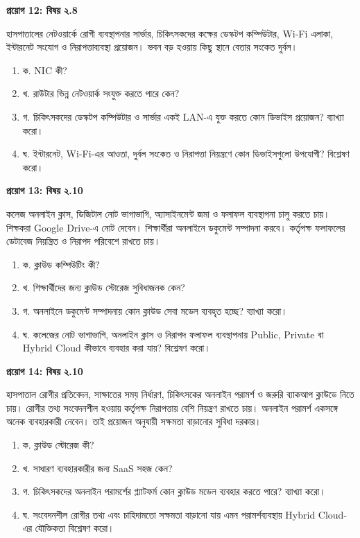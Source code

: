 \par{}
\textbf{প্রয়োগ 12: বিষয় ২.8}\par
হাসপাতালের নেটওয়ার্কে রোগী ব্যবস্থাপনার সার্ভার, চিকিৎসকদের কক্ষের ডেস্কটপ কম্পিউটার, Wi-Fi এলাকা, ইন্টারনেট সংযোগ ও নিরাপত্তাব্যবস্থা প্রয়োজন। ভবন বড় হওয়ায় কিছু স্থানে বেতার সংকেত দুর্বল।

\begin{enumerate}
\item ক. NIC কী?
\item খ. রাউটার ভিন্ন নেটওয়ার্ক সংযুক্ত করতে পারে কেন?
\item গ. চিকিৎসকদের ডেস্কটপ কম্পিউটার ও সার্ভার একই LAN-এ যুক্ত করতে কোন ডিভাইস প্রয়োজন? ব্যাখ্যা করো।
\item ঘ. ইন্টারনেট, Wi-Fi-এর আওতা, দুর্বল সংকেত ও নিরাপত্তা নিয়ন্ত্রণে কোন ডিভাইসগুলো উপযোগী? বিশ্লেষণ করো।
\end{enumerate}
\par

\par{}
\textbf{প্রয়োগ 13: বিষয় ২.10}\par
\par
কলেজ অনলাইন ক্লাস, ডিজিটাল নোট ভাগাভাগি, অ্যাসাইনমেন্ট জমা ও ফলাফল ব্যবস্থাপনা চালু করতে চায়। শিক্ষকরা Google Drive-এ নোট দেবেন। শিক্ষার্থীরা অনলাইনে ডকুমেন্ট সম্পাদনা করবে। কর্তৃপক্ষ ফলাফলের ডেটাবেজ নিয়ন্ত্রিত ও নিরাপদ পরিবেশে রাখতে চায়।

\begin{enumerate}
\item ক. ক্লাউড কম্পিউটিং কী?
\item খ. শিক্ষার্থীদের জন্য ক্লাউড স্টোরেজ সুবিধাজনক কেন?
\item গ. অনলাইনে ডকুমেন্ট সম্পাদনায় কোন ক্লাউড সেবা মডেল ব্যবহৃত হচ্ছে? ব্যাখ্যা করো।
\item ঘ. কলেজের নোট ভাগাভাগি, অনলাইন ক্লাস ও নিরাপদ ফলাফল ব্যবস্থাপনায় Public, Private বা Hybrid Cloud কীভাবে ব্যবহার করা যায়? বিশ্লেষণ করো।
\end{enumerate}
\par

\par{}
\textbf{প্রয়োগ 14: বিষয় ২.10}\par
হাসপাতাল রোগীর প্রতিবেদন, সাক্ষাতের সময় নির্ধারণ, চিকিৎসকের অনলাইন পরামর্শ ও জরুরি ব্যাকআপ ক্লাউডে নিতে চায়। রোগীর তথ্য সংবেদনশীল হওয়ায় কর্তৃপক্ষ নিরাপত্তায় বেশি নিয়ন্ত্রণ রাখতে চায়। অনলাইন পরামর্শ একসঙ্গে অনেক ব্যবহারকারী নেবেন। তাই প্রয়োজন অনুযায়ী সক্ষমতা বাড়ানোর সুবিধা দরকার।

\begin{enumerate}
\item ক. ক্লাউড স্টোরেজ কী?
\item খ. সাধারণ ব্যবহারকারীর জন্য SaaS সহজ কেন?
\item গ. চিকিৎসকদের অনলাইন পরামর্শের প্ল্যাটফর্ম কোন ক্লাউড মডেল ব্যবহার করতে পারে? ব্যাখ্যা করো।
\item ঘ. সংবেদনশীল রোগীর তথ্য এবং চাহিদামতো সক্ষমতা বাড়ানো যায় এমন পরামর্শব্যবস্থায় Hybrid Cloud-এর যৌক্তিকতা বিশ্লেষণ করো।
\end{enumerate}
\par

